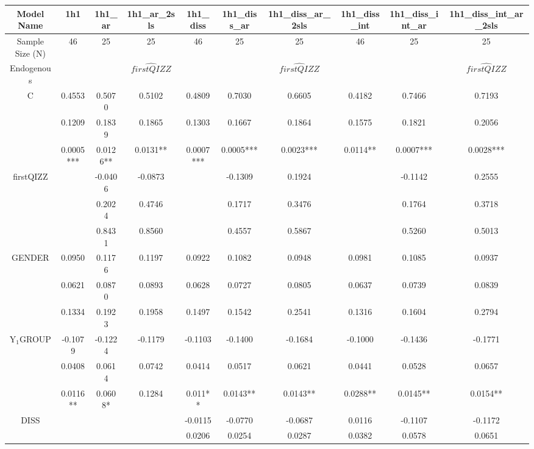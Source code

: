 \documentclass[]{article}
\begin{document}
	\begin{landscape}
		\begin{table}[htp] 
			\centering 
			\begin{adjustbox}{height=0.55\textheight,width=1.6\textwidth}
				\begin{tabular}{c|ccc|ccc|ccc}
					\hline
					Model Name & 1h1 & 1h1\_ar & 1h1\_ar\_2sls & 1h1\_diss & 1h1\_diss\_ar & 1h1\_diss\_ar\_2sls & 1h1\_diss\_int & 1h1\_diss\_int\_ar & 1h1\_diss\_int\_ar\_2sls \\
					\hline
					Sample Size (N) & 46 & 25 & 25 & 46 & 25 & 25 & 46 & 25 & 25 \\
					\hline
					Endogenous &  &  & $\hat{firstQIZZ}$ &  &  & $\hat{firstQIZZ}$ &  &  & $\hat{firstQIZZ}$ \\
					\hline
					C & 0.4553 & 0.5070 & 0.5102 & 0.4809 & 0.7030 & 0.6605 & 0.4182 & 0.7466 & 0.7193 \\
					& 0.1209 & 0.1839 & 0.1865 & 0.1303 & 0.1667 & 0.1864 & 0.1575 & 0.1821 & 0.2056 \\
					& 0.0005*** & 0.0126** & 0.0131** & 0.0007*** & 0.0005*** & 0.0023*** & 0.0114** & 0.0007*** & 0.0028*** \\
					\hline
					firstQIZZ &  & -0.0406 & -0.0873 &  & -0.1309 & 0.1924 &  & -0.1142 & 0.2555 \\
					&  & 0.2024 & 0.4746 &  & 0.1717 & 0.3476 &  & 0.1764 & 0.3718 \\
					&  & 0.8431 & 0.8560 &  & 0.4557 & 0.5867 &  & 0.5260 & 0.5013 \\
					\hline
					GENDER & 0.0950 & 0.1176 & 0.1197 & 0.0922 & 0.1082 & 0.0948 & 0.0981 & 0.1085 & 0.0937 \\
					& 0.0621 & 0.0870 & 0.0893 & 0.0628 & 0.0727 & 0.0805 & 0.0637 & 0.0739 & 0.0839 \\
					& 0.1334 & 0.1923 & 0.1958 & 0.1497 & 0.1542 & 0.2541 & 0.1316 & 0.1604 & 0.2794 \\
					\hline
					Y$_1$GROUP & -0.1079 & -0.1224 & -0.1179 & -0.1103 & -0.1400 & -0.1684 & -0.1000 & -0.1436 & -0.1771 \\
					& 0.0408 & 0.0614 & 0.0742 & 0.0414 & 0.0517 & 0.0621 & 0.0441 & 0.0528 & 0.0657 \\
					& 0.0116** & 0.0608* & 0.1284 & 0.011** & 0.0143** & 0.0143** & 0.0288** & 0.0145** & 0.0154** \\
					\hline
					DISS &  &  &  & -0.0115 & -0.0770 & -0.0687 & 0.0116 & -0.1107 & -0.1172 \\
					&  &  &  & 0.0206 & 0.0254 & 0.0287 & 0.0382 & 0.0578 & 0.0651 \\

\end{tabular}
\end{adjustbox}
\end{table}
\end{landscape}
\end{document}
